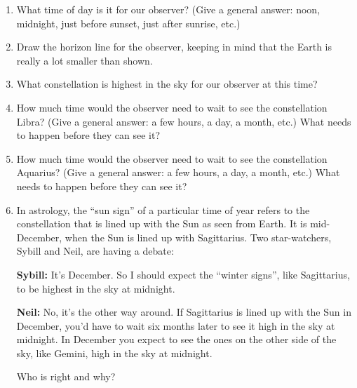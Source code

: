 \documentclass[12pt]{article}
\begin{document}
\begin{enumerate}
	\item What time of day is it for our observer? (Give a general answer: noon, midnight, just before sunset, just after sunrise, etc.)
	
	\vspace{1in}
	\item Draw the horizon line for the observer, keeping in mind that the Earth is really a lot smaller than shown.
	
		
	\item What constellation is highest in the sky for our observer at this time?
	
	\vspace{0.5in}
	
	\item How much time would the observer need to wait to see the constellation Libra? (Give a general answer: a few hours, a day, a month, etc.) What needs to happen before they can see it?
	
	\vspace{0.8in}
	
	\item How much time would the observer need to wait to see the constellation Aquarius? (Give a general answer: a few hours, a day, a month, etc.) What needs to happen before they can see it?
	
	\vspace{0.8in}
	
	\item In astrology, the ``sun sign'' of a particular time of year refers to the constellation that is lined up with the Sun as seen from Earth. It is mid-December, when the Sun is lined up with Sagittarius. Two star-watchers, Sybill and Neil, are having a debate:
	
	{\bf Sybill:} It's December. So I should expect the ``winter signs'', like Sagittarius, to be highest in the sky at midnight.
	
	{\bf Neil:} No, it's the other way around. If Sagittarius is lined up with the Sun in December, you'd have to wait six months later to see it high in the sky at midnight. In December you expect to see the ones on the other side of the sky, like Gemini, high in the sky at midnight.
	
	Who is right and why?
	

\end{enumerate}
\end{document}
